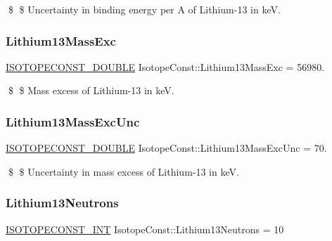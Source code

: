 \$ \$ Uncertainty in binding energy per A of Lithium-\/13 in keV. \mbox{\label{group___isotope_const-_lithium-_li13_ga81858c219edea4b3a884e0866293880c}} 
\subsubsection{\texorpdfstring{Lithium13\+Mass\+Exc}{Lithium13MassExc}}
{\footnotesize\ttfamily \mbox{\hyperlink{group___isotope_const-_macros_ga8f45a7272ce02c0b4c65c44636ed719a}{I\+S\+O\+T\+O\+P\+E\+C\+O\+N\+S\+T\+\_\+\+D\+O\+U\+B\+LE}} Isotope\+Const\+::\+Lithium13\+Mass\+Exc = 56980.}

\$ \$ Mass excess of Lithium-\/13 in keV. \mbox{\label{group___isotope_const-_lithium-_li13_gaed075b3fb8d560bcb741bbf3e72bf08b}} 
\subsubsection{\texorpdfstring{Lithium13\+Mass\+Exc\+Unc}{Lithium13MassExcUnc}}
{\footnotesize\ttfamily \mbox{\hyperlink{group___isotope_const-_macros_ga8f45a7272ce02c0b4c65c44636ed719a}{I\+S\+O\+T\+O\+P\+E\+C\+O\+N\+S\+T\+\_\+\+D\+O\+U\+B\+LE}} Isotope\+Const\+::\+Lithium13\+Mass\+Exc\+Unc = 70.}

\$ \$ Uncertainty in mass excess of Lithium-\/13 in keV. \mbox{\label{group___isotope_const-_lithium-_li13_gabb378c55eefb95314d2423b7b9945a61}} 
\subsubsection{\texorpdfstring{Lithium13\+Neutrons}{Lithium13Neutrons}}
{\footnotesize\ttfamily \mbox{\hyperlink{group___isotope_const-_macros_ga5f18360b3e99483a35c32d789e62621c}{I\+S\+O\+T\+O\+P\+E\+C\+O\+N\+S\+T\+\_\+\+I\+NT}} Isotope\+Const\+::\+Lithium13\+Neutrons = 10}

